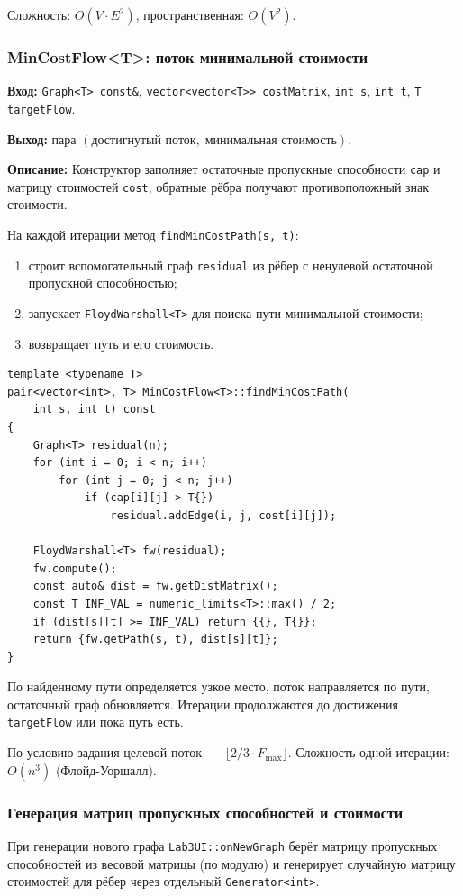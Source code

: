 Сложность: $O(V \cdot E^2)$, пространственная: $O(V^2)$.

\subsubsection{MinCostFlow\textless T\textgreater: поток минимальной стоимости}

\textbf{Вход:} \texttt{Graph<T> const\&}, \texttt{vector<vector<T>> costMatrix},
\texttt{int s}, \texttt{int t}, \texttt{T targetFlow}.

\textbf{Выход:} пара $(\text{достигнутый поток},\; \text{минимальная стоимость})$.

\textbf{Описание:} Конструктор заполняет остаточные пропускные способности
\texttt{cap} и матрицу стоимостей \texttt{cost}; обратные рёбра получают
противоположный знак стоимости.

На каждой итерации метод \texttt{findMinCostPath(s, t)}:
\begin{enumerate}
    \item строит вспомогательный граф \texttt{residual} из рёбер с ненулевой
          остаточной пропускной способностью;
    \item запускает \texttt{FloydWarshall<T>} для поиска пути минимальной стоимости;
    \item возвращает путь и его стоимость.
\end{enumerate}

\begin{lstlisting}[style=cstyle, caption={Поиск пути минимальной стоимости (mincost.cpp)}]
template <typename T>
pair<vector<int>, T> MinCostFlow<T>::findMinCostPath(
    int s, int t) const
{
    Graph<T> residual(n);
    for (int i = 0; i < n; i++)
        for (int j = 0; j < n; j++)
            if (cap[i][j] > T{})
                residual.addEdge(i, j, cost[i][j]);

    FloydWarshall<T> fw(residual);
    fw.compute();
    const auto& dist = fw.getDistMatrix();
    const T INF_VAL = numeric_limits<T>::max() / 2;
    if (dist[s][t] >= INF_VAL) return {{}, T{}};
    return {fw.getPath(s, t), dist[s][t]};
}
\end{lstlisting}

По найденному пути определяется узкое место, поток направляется по пути,
остаточный граф обновляется. Итерации продолжаются до достижения
\texttt{targetFlow} или пока путь есть.

По условию задания целевой поток~--- $\lfloor 2/3 \cdot F_{\max} \rfloor$.
Сложность одной итерации: $O(n^3)$ (Флойд-Уоршалл).

\subsubsection{Генерация матриц пропускных способностей и стоимости}

При генерации нового графа \texttt{Lab3UI::onNewGraph} берёт матрицу
пропускных способностей из весовой матрицы (по модулю) и генерирует
случайную матрицу стоимостей для рёбер через отдельный \texttt{Generator<int>}.
